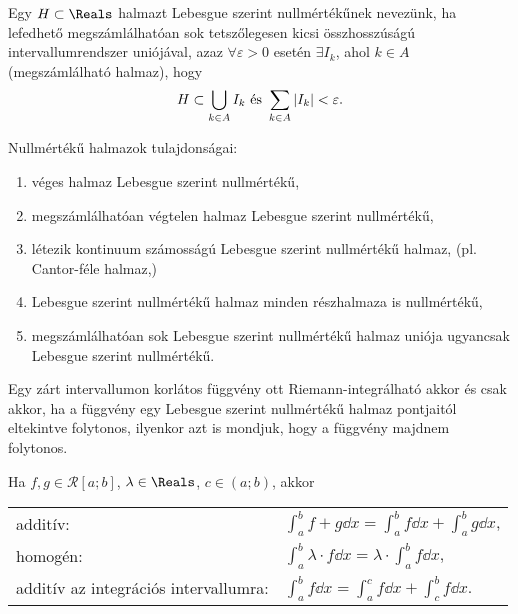 \begin{definition}
  Egy $H \subset \Reals$ halmazt Lebesgue szerint nullmértékűnek nevezünk, ha
  lefedhető megszámlálhatóan sok tetszőlegesen kicsi összhosszúságú
  intervallumrendszer uniójával, azaz $\forall \varepsilon > 0$ esetén $\exists
    I_k$, ahol $k \in A$ (megszámlálható halmaz), hogy
  \[
    H \subset \bigcup_{k \in A} I_k
    \text{ és }
    \sum_{k \in A} |I_k| < \varepsilon
    \text.
  \]

  Nullmértékű halmazok tulajdonságai:
  \begin{enumerate}
    \item véges halmaz Lebesgue szerint nullmértékű,
    \item megszámlálhatóan végtelen halmaz Lebesgue szerint nullmértékű,
    \item létezik kontinuum számosságú Lebesgue szerint nullmértékű halmaz, (pl.
          Can\-tor\--féle halmaz,)
    \item Lebesgue szerint nullmértékű halmaz minden részhalmaza is nullmértékű,
    \item megszámlálhatóan sok Lebesgue szerint nullmértékű halmaz uniója
          ugyancsak Lebesgue szerint nullmértékű.
  \end{enumerate}
\end{definition}

\begin{theorem}
  Egy zárt intervallumon korlátos függvény ott Riemann-integrálható akkor és
  csak akkor, ha a függvény egy Lebesgue szerint nullmértékű halmaz pontjaitól
  eltekintve folytonos, ilyenkor azt is mondjuk, hogy a függvény majdnem
  folytonos.
\end{theorem}

\begin{theorem}
  Ha $f, g \in \mathcal R[a;b]$, $\lambda \in \Reals$, $c \in (a; b)$, akkor
  \begin{center}
    \begin{tabular}{l l}
      additív:                              & \(
      \displaystyle \int_a^b f + g \dd x = \int_a^b f \dd x + \int_a^b g \dd x
      \),                                        \\[2mm]
      homogén:                              & \(
      \displaystyle \int_a^b \lambda \cdot f \dd x = \lambda \cdot \int_a^b f \dd x
      \),                                        \\[2mm]
      additív az integrációs intervallumra: & \(
      \displaystyle \int_a^b f \dd x = \int_a^c f \dd x + \int_c^b f \dd x
      \).
    \end{tabular}
  \end{center}
\end{theorem}


